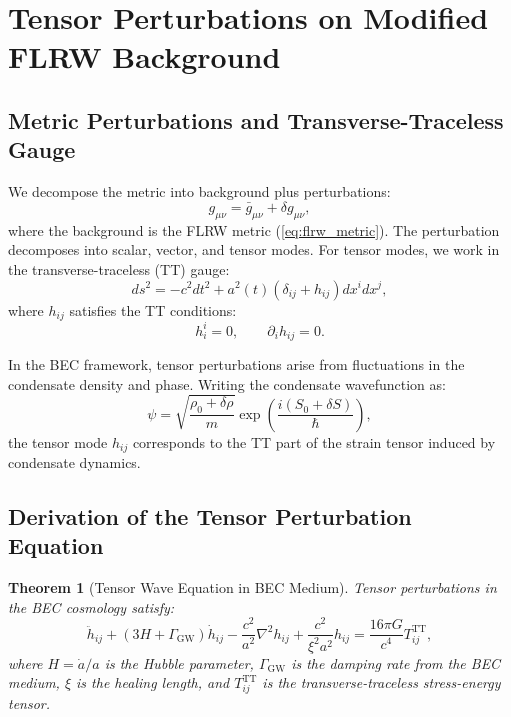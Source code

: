 \documentclass[11pt,a4paper]{article}
\newtheorem{theorem}{Theorem}[section]
\theoremstyle{definition}
\theoremstyle{remark}
\begin{document}
\section{Tensor Perturbations on Modified FLRW Background}
\label{sec:tensor_equation}

\subsection{Metric Perturbations and Transverse-Traceless Gauge}
\label{sec:metric_perturbations}

We decompose the metric into background plus perturbations:
\begin{equation}
\label{eq:perturbed_metric}
g_{\mu\nu} = \bar{g}_{\mu\nu} + \delta g_{\mu\nu},
\end{equation}
where the background is the FLRW metric (\ref{eq:flrw_metric}). The perturbation decomposes into scalar, vector, and tensor modes. For tensor modes, we work in the transverse-traceless (TT) gauge:
\begin{equation}
\label{eq:tensor_perturbation}
ds^2 = -c^2 dt^2 + a^2(t)(\delta_{ij} + h_{ij})dx^i dx^j,
\end{equation}
where $h_{ij}$ satisfies the TT conditions:
\begin{equation}
\label{eq:tt_conditions}
h^i_i = 0, \qquad \partial_i h_{ij} = 0.
\end{equation}

In the BEC framework, tensor perturbations arise from fluctuations in the condensate density and phase. Writing the condensate wavefunction as:
\begin{equation}
\psi = \sqrt{\frac{\rho_0 + \delta\rho}{m}}\exp\left(\frac{i(S_0 + \delta S)}{\hbar}\right),
\end{equation}
the tensor mode $h_{ij}$ corresponds to the TT part of the strain tensor induced by condensate dynamics.

\subsection{Derivation of the Tensor Perturbation Equation}
\label{sec:tensor_derivation}

\begin{theorem}[Tensor Wave Equation in BEC Medium]
\label{thm:tensor_equation}
Tensor perturbations in the BEC cosmology satisfy:
\begin{equation}
\label{eq:tensor_wave_equation}
\boxed{\ddot{h}_{ij} + \left(3H + \Gamma_{\mathrm{GW}}\right)\dot{h}_{ij} - \frac{c^2}{a^2}\nabla^2 h_{ij} + \frac{c^2}{\xi^2 a^2}h_{ij} = \frac{16\pi G}{c^4}T_{ij}^{\mathrm{TT}},}
\end{equation}
where $H = \dot{a}/a$ is the Hubble parameter, $\Gamma_{\mathrm{GW}}$ is the damping rate from the BEC medium, $\xi$ is the healing length, and $T_{ij}^{\mathrm{TT}}$ is the transverse-traceless stress-energy tensor.
\end{theorem}
\end{document}
